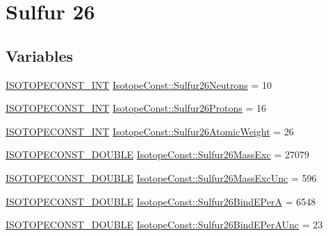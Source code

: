 \hypertarget{group___isotope_const-_sulfur-_s26}{}\section{Sulfur 26}
\label{group___isotope_const-_sulfur-_s26}
\subsection*{Variables}
\begin{DoxyCompactItemize}
\item 
\mbox{\hyperlink{group___isotope_const-_macros_ga5f18360b3e99483a35c32d789e62621c}{I\+S\+O\+T\+O\+P\+E\+C\+O\+N\+S\+T\+\_\+\+I\+NT}} \mbox{\hyperlink{group___isotope_const-_sulfur-_s26_ga0bdab41f5452502a54af4d8394b1f9a3}{Isotope\+Const\+::\+Sulfur26\+Neutrons}} = 10
\item 
\mbox{\hyperlink{group___isotope_const-_macros_ga5f18360b3e99483a35c32d789e62621c}{I\+S\+O\+T\+O\+P\+E\+C\+O\+N\+S\+T\+\_\+\+I\+NT}} \mbox{\hyperlink{group___isotope_const-_sulfur-_s26_ga4f318d916d0e29a548bcf8dabfd9fc78}{Isotope\+Const\+::\+Sulfur26\+Protons}} = 16
\item 
\mbox{\hyperlink{group___isotope_const-_macros_ga5f18360b3e99483a35c32d789e62621c}{I\+S\+O\+T\+O\+P\+E\+C\+O\+N\+S\+T\+\_\+\+I\+NT}} \mbox{\hyperlink{group___isotope_const-_sulfur-_s26_gacae4626a4f88bd66326b313fe0a1895b}{Isotope\+Const\+::\+Sulfur26\+Atomic\+Weight}} = 26
\item 
\mbox{\hyperlink{group___isotope_const-_macros_ga8f45a7272ce02c0b4c65c44636ed719a}{I\+S\+O\+T\+O\+P\+E\+C\+O\+N\+S\+T\+\_\+\+D\+O\+U\+B\+LE}} \mbox{\hyperlink{group___isotope_const-_sulfur-_s26_ga9f3fda9b51afda3e776542ab2f21bfed}{Isotope\+Const\+::\+Sulfur26\+Mass\+Exc}} = 27079
\item 
\mbox{\hyperlink{group___isotope_const-_macros_ga8f45a7272ce02c0b4c65c44636ed719a}{I\+S\+O\+T\+O\+P\+E\+C\+O\+N\+S\+T\+\_\+\+D\+O\+U\+B\+LE}} \mbox{\hyperlink{group___isotope_const-_sulfur-_s26_ga195fa9c90828aca7d02d56a152bb68d4}{Isotope\+Const\+::\+Sulfur26\+Mass\+Exc\+Unc}} = 596
\item 
\mbox{\hyperlink{group___isotope_const-_macros_ga8f45a7272ce02c0b4c65c44636ed719a}{I\+S\+O\+T\+O\+P\+E\+C\+O\+N\+S\+T\+\_\+\+D\+O\+U\+B\+LE}} \mbox{\hyperlink{group___isotope_const-_sulfur-_s26_ga8785f5db6cbac0e2972671883c1f8164}{Isotope\+Const\+::\+Sulfur26\+Bind\+E\+PerA}} = 6548
\item 
\mbox{\hyperlink{group___isotope_const-_macros_ga8f45a7272ce02c0b4c65c44636ed719a}{I\+S\+O\+T\+O\+P\+E\+C\+O\+N\+S\+T\+\_\+\+D\+O\+U\+B\+LE}} \mbox{\hyperlink{group___isotope_const-_sulfur-_s26_ga68929dfba46de0bf15554e9e47dced06}{Isotope\+Const\+::\+Sulfur26\+Bind\+E\+Per\+A\+Unc}} = 23

\end{DoxyCompactItemize}
